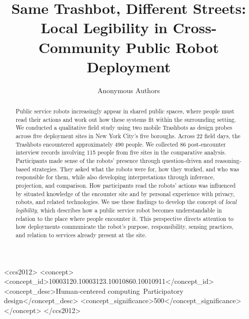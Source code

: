 \documentclass[manuscript,review,anonymous]{acmart}
\newcommand {\note}[1]{\textcolor{purple}{Note: {#1}}}
\begin{document}
\title[Same Trashbot, Different Streets]{Same Trashbot, Different Streets: Local Legibility in Cross-Community Public Robot Deployment}

\author{Anonymous Authors}

\begin{abstract}
Public service robots increasingly appear in shared public spaces, where people must read their actions and work out how these systems fit within the surrounding setting. We conducted a qualitative field study using two mobile Trashbots as design probes across five deployment sites in New York City's five boroughs. Across 22 field days, the Trashbots encountered approximately 490 people. We collected 86 post-encounter interview records involving 115 people from five sites in the comparative analysis. Participants made sense of the robots' presence through question-driven and reasoning-based strategies. They asked what the robots were for, how they worked, and who was responsible for them, while also developing interpretations through inference, projection, and comparison. How participants read the robots' actions was influenced by situated knowledge of the encounter site and by personal experience with privacy, robots, and related technologies. We use these findings to develop the concept of \emph{local legibility}, which describes how a public service robot becomes understandable in relation to the place where people encounter it. This perspective directs attention to how deployments communicate the robot's purpose, responsibility, sensing practices, and relation to services already present at the site.
\end{abstract}

\begin{CCSXML}
<ccs2012>
   <concept>
       <concept_id>10003120.10003123.10010860.10010911</concept_id>
       <concept_desc>Human-centered computing~Participatory design</concept_desc>
       <concept_significance>500</concept_significance>
       </concept>
 </ccs2012>
\end{CCSXML}

\end{document}
